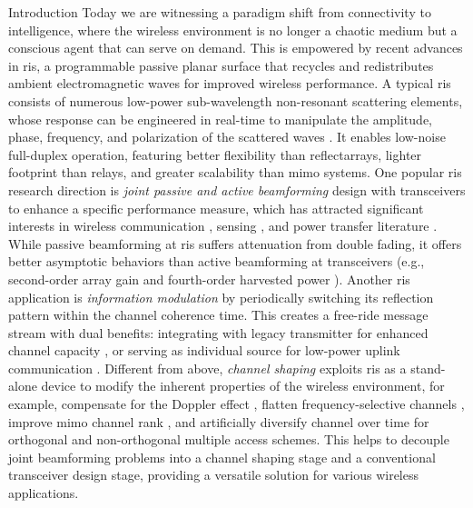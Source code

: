 \documentclass[journal]{IEEEtran}
\begin{document}
\begin{section}{Introduction}
		Today we are witnessing a paradigm shift from connectivity to intelligence, where the wireless environment is no longer a chaotic medium but a conscious agent that can serve on demand.
		This is empowered by recent advances in \gls{ris}, a programmable passive planar surface that recycles and redistributes ambient electromagnetic waves for improved wireless performance.
		A typical \gls{ris} consists of numerous low-power sub-wavelength non-resonant scattering elements, whose response can be engineered in real-time to manipulate the amplitude, phase, frequency, and polarization of the scattered waves \cite{Basar2019}.
		It enables low-noise full-duplex operation, featuring better flexibility than reflectarrays, lighter footprint than relays, and greater scalability than \gls{mimo} systems.
		One popular \gls{ris} research direction is \emph{joint passive and active beamforming} design with transceivers to enhance a specific performance measure, which has attracted significant interests in wireless communication \cite{Wu2019,Guo2020,Liu2022}, sensing \cite{He2022,Luo2022,Hua2023}, and power transfer literature \cite{Wu2020a,Feng2022,Zhao2022}.
		While passive beamforming at \gls{ris} suffers attenuation from double fading, it offers better asymptotic behaviors than active beamforming at transceivers (e.g., second-order array gain and fourth-order harvested power \cite{Zhao2022}).
		Another \gls{ris} application is \emph{information modulation} by periodically switching its reflection pattern within the channel coherence time.
		This creates a free-ride message stream with dual benefits: integrating with legacy transmitter for enhanced channel capacity \cite{Karasik2020,Ye2022}, or serving as individual source for low-power uplink communication \cite{Liang2020,Zhao2024}.
		Different from above, \emph{channel shaping} exploits \gls{ris} as a stand-alone device to modify the inherent properties of the wireless environment, for example, compensate for the Doppler effect \cite{Basar2021}, flatten frequency-selective channels \cite{Arslan2022}, improve \gls{mimo} channel rank \cite{Ozdogan2020a}, and artificially diversify channel over time for orthogonal \cite{Yang2019} and non-orthogonal \cite{Chen2023} multiple access schemes.
		This helps to decouple joint beamforming problems into a channel shaping stage and a conventional transceiver design stage, providing a versatile solution for various wireless applications.


\end{section}
\end{document}
